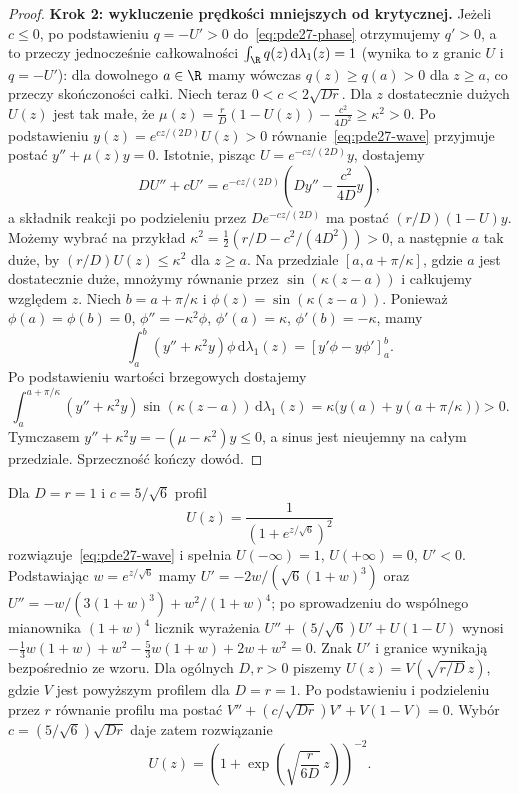 \begin{proof}
\textbf{Krok 2: wykluczenie prędkości mniejszych od krytycznej.}
Jeżeli $c\le0$, po podstawieniu $q=-U'>0$
do~\eqref{eq:pde27-phase} otrzymujemy $q'>0$,
a to przeczy jednocześnie całkowalności
$\int_\R q(z)\,\mathrm d\lambda_1(z)=1$
(wynika to z granic $U$ i $q=-U'$):
dla dowolnego $a\in\R$ mamy wówczas
$q(z)\ge q(a)>0$ dla $z\ge a$, co przeczy
skończoności całki.
Niech teraz $0<c<2\sqrt{Dr}$. Dla $z$ dostatecznie dużych
$U(z)$ jest tak małe, że
$\mu(z)=\frac rD(1-U(z))-\frac{c^2}{4D^2}\ge\kappa^2>0$.
Po podstawieniu $y(z)=e^{cz/(2D)}U(z)>0$
równanie~\eqref{eq:pde27-wave} przyjmuje postać
$y''+\mu(z)y=0$. Istotnie, pisząc
$U=e^{-cz/(2D)}y$, dostajemy
\[
 DU''+cU'=e^{-cz/(2D)}
 \left(Dy''-\frac{c^2}{4D}y\right),
\]
a składnik reakcji po podzieleniu przez
$De^{-cz/(2D)}$ ma postać $(r/D)(1-U)y$.
Możemy wybrać na przykład
$\kappa^2=\frac12(r/D-c^2/(4D^2))>0$,
a następnie $a$ tak duże, by
$(r/D)U(z)\le\kappa^2$ dla $z\ge a$.
Na przedziale $[a,a+\pi/\kappa]$, gdzie $a$ jest
dostatecznie duże, mnożymy równanie przez
$\sin(\kappa(z-a))$ i całkujemy względem $z$.
Niech $b=a+\pi/\kappa$ i
$\phi(z)=\sin(\kappa(z-a))$.
Ponieważ $\phi(a)=\phi(b)=0$, $\phi''=-\kappa^2\phi$,
$\phi'(a)=\kappa$, $\phi'(b)=-\kappa$, mamy
\[
 \int_a^b(y''+\kappa^2y)\phi\,\mathrm d\lambda_1(z)
 =[y'\phi-y\phi']_a^b.
\]
Po podstawieniu wartości brzegowych dostajemy
\[
 \int_a^{a+\pi/\kappa}(y''+\kappa^2y)
 \sin(\kappa(z-a))\,\mathrm d\lambda_1(z)
 =\kappa\bigl(y(a)+y(a+\pi/\kappa)\bigr)>0.
\]
Tymczasem $y''+\kappa^2y=-(\mu-\kappa^2)y\le0$,
a sinus jest nieujemny na całym przedziale.
Sprzeczność kończy dowód.
\end{proof}

\begin{przyklad}
\label{ex:pde27-explicit}
Dla $D=r=1$ i $c=5/\sqrt6$ profil
\[
 U(z)=\frac{1}{(1+e^{z/\sqrt6})^2}
\]
rozwiązuje~\eqref{eq:pde27-wave} i spełnia
$U(-\infty)=1$, $U(+\infty)=0$, $U'<0$.
Podstawiając $w=e^{z/\sqrt6}$ mamy
$U'=-2w/(\sqrt6(1+w)^3)$ oraz
$U''=-w/(3(1+w)^3)+w^2/(1+w)^4$;
po sprowadzeniu do wspólnego mianownika $(1+w)^4$
licznik wyrażenia $U''+(5/\sqrt6)U'+U(1-U)$
wynosi
$-\frac13 w(1+w)+w^2-\frac53w(1+w)+2w+w^2=0$.
Znak $U'$ i granice wynikają bezpośrednio ze wzoru.
Dla ogólnych $D,r>0$ piszemy
$U(z)=V(\sqrt{r/D}\,z)$, gdzie $V$ jest powyższym
profilem dla $D=r=1$. Po podstawieniu i podzieleniu
przez $r$ równanie profilu ma postać
$V''+(c/\sqrt{Dr})V'+V(1-V)=0$.
Wybór $c=(5/\sqrt6)\sqrt{Dr}$ daje zatem
rozwiązanie
\[
 U(z)=\left(1+\exp\left(\sqrt{\frac r{6D}}\,z\right)\right)^{-2}.
\]
\end{przyklad}

